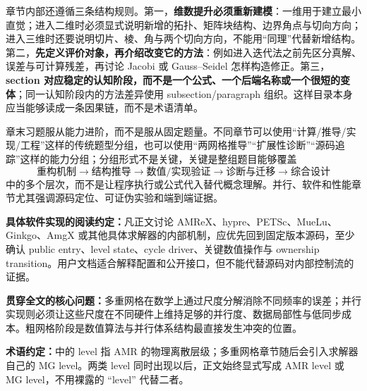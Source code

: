 章节内部还遵循三条结构规则。第一，\textbf{维数提升必须重新建模}：一维用于建立最小直觉；进入二维时必须显式说明新增的拓扑、矩阵块结构、边界角点与切向方向；进入三维时还要说明切片、棱、角与两个切向方向，不能用“同理”代替新增结构。第二，\textbf{先定义评价对象，再介绍改变它的方法}：例如进入迭代法之前先区分真解、误差与可计算残差，再讨论 Jacobi 或 Gauss--Seidel 怎样构造修正。第三，\textbf{section 对应稳定的认知阶段，而不是一个公式、一个后端名称或一个很短的变体}；同一认知阶段内的方法差异使用 subsection/paragraph 组织。这样目录本身应当能够读成一条因果链，而不是术语清单。


章末习题服从能力进阶，而不是服从固定题量。不同章节可以使用“计算/推导/实现/工程”这样的传统题型分组，也可以使用“两网格推导”“扩展性诊断”“源码追踪”这样的能力分组；分组形式不是关键，关键是整组题目能够覆盖
\begin{equation}
\boxed{
\text{重构机制}
\rightarrow
\text{结构推导}
\rightarrow
\text{数值/实现验证}
\rightarrow
\text{诊断与迁移}
\rightarrow
\text{综合设计}
}
\end{equation}
中的多个层次，而不是让程序执行或公式代入替代概念理解。并行、软件和性能章节尤其强调源码定位、可证伪实验和端到端证据。

\begin{keybox}
\textbf{具体软件实现的阅读约定：}凡正文讨论 AMReX、hypre、PETSc、MueLu、Ginkgo、AmgX 或其他具体求解器的内部机制，应优先回到固定版本源码，至少确认 public entry、level state、cycle driver、关键数值操作与 ownership transition。用户文档适合解释配置和公开接口，但不能代替源码对内部控制流的证据。
\end{keybox}

\begin{keybox}
\textbf{贯穿全文的核心问题：}多重网格在数学上通过尺度分解消除不同频率的误差；并行实现则必须让这些尺度在不同硬件上维持足够的并行度、数据局部性与低同步成本。粗网格阶段是数值算法与并行体系结构最直接发生冲突的位置。
\end{keybox}

\begin{warningbox}
\textbf{术语约定：}中的 level 指 AMR 的物理离散层级；多重网格章节随后会引入求解器自己的 MG level。两类 level 同时出现以后，正文始终显式写成 AMR level 或 MG level，不用裸露的 ``level'' 代替二者。
\end{warningbox}
